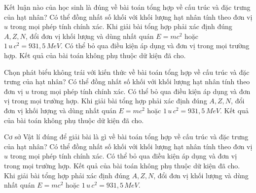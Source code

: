 \begin{ex}
Kết luận nào của học sinh là đúng về bài toán tổng hợp về cấu trúc và đặc trưng của hạt nhân?
\choice
{Có thể đồng nhất số khối với khối lượng hạt nhân tính theo đơn vị $u$ trong mọi phép tính chính xác.}
{\True Khi giải bài tổng hợp phải xác định đúng $A,Z,N$, đổi đơn vị khối lượng và dùng nhất quán $E=mc^2$ hoặc $1\,u\,c^2=931,5\,MeV$.}
{Có thể bỏ qua điều kiện áp dụng và đơn vị trong mọi trường hợp.}
{Kết quả của bài toán không phụ thuộc dữ kiện đã cho.}
\end{ex}

\begin{ex}
Chọn phát biểu không trái với kiến thức về bài toán tổng hợp về cấu trúc và đặc trưng của hạt nhân?
\choice
{Có thể đồng nhất số khối với khối lượng hạt nhân tính theo đơn vị $u$ trong mọi phép tính chính xác.}
{Có thể bỏ qua điều kiện áp dụng và đơn vị trong mọi trường hợp.}
{\True Khi giải bài tổng hợp phải xác định đúng $A,Z,N$, đổi đơn vị khối lượng và dùng nhất quán $E=mc^2$ hoặc $1\,u\,c^2=931,5\,MeV$.}
{Kết quả của bài toán không phụ thuộc dữ kiện đã cho.}
\end{ex}

\begin{ex}
Cơ sở Vật lí đúng để giải bài là gì về bài toán tổng hợp về cấu trúc và đặc trưng của hạt nhân?
\choice
{Có thể đồng nhất số khối với khối lượng hạt nhân tính theo đơn vị $u$ trong mọi phép tính chính xác.}
{Có thể bỏ qua điều kiện áp dụng và đơn vị trong mọi trường hợp.}
{Kết quả của bài toán không phụ thuộc dữ kiện đã cho.}
{\True Khi giải bài tổng hợp phải xác định đúng $A,Z,N$, đổi đơn vị khối lượng và dùng nhất quán $E=mc^2$ hoặc $1\,u\,c^2=931,5\,MeV$.}
\end{ex}

